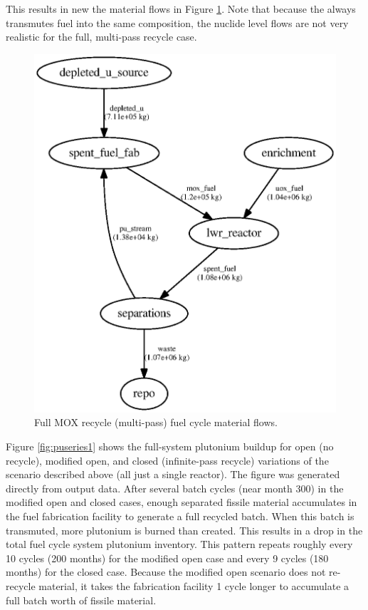 This results in new the material flows in Figure \ref{fig:flowclosed}. Note
that because the  always transmutes fuel into the same
composition, the nuclide level flows are not very realistic for the full, 
multi-pass
recycle case.

\begin{figure}[H]
\caption{Full \gls{MOX} recycle (multi-pass) fuel cycle material flows.}
\begin{center}
\includegraphics{./images/flow-closed-1.eps}
\end{center}
\label{fig:flowclosed}
\end{figure}

Figure \ref{fig:puseries1} shows the full-system plutonium buildup for open
(no recycle), modified open, and closed (infinite-pass recycle) variations of
the scenario described above (all just a single reactor).  The figure was
generated directly from \Cyclus output data. After several batch cycles (near
month 300) in the modified open and closed cases, enough separated fissile
material accumulates in the fuel fabrication facility to generate a full
recycled batch.  When this batch is transmuted, more plutonium is burned than
created.  This results in a drop in the total fuel cycle system plutonium
inventory.  This pattern repeats roughly every 10 cycles (200 months) for the
modified open case and every 9 cycles (180 months) for the closed case.
Because the modified open scenario does not re-recycle material, it takes the
fabrication facility 1 cycle longer to accumulate a full batch worth of
fissile material. 

